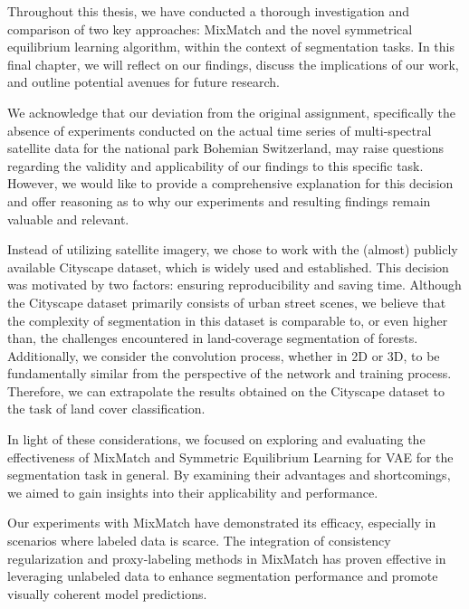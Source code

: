 Throughout this thesis, we have conducted a thorough investigation and comparison of two key approaches: MixMatch
and the novel symmetrical equilibrium learning algorithm, within the context of segmentation tasks. In this final chapter, we
will reflect on our findings, discuss the implications of our work, and outline potential avenues for future research.

We acknowledge that our deviation from the original assignment, specifically the absence of experiments conducted on the actual 
time series of multi-spectral satellite data for the national park Bohemian Switzerland, may raise questions regarding the validity 
and applicability of our findings to this specific task. However, we would like to provide a comprehensive explanation for this 
decision and offer reasoning as to why our experiments and resulting findings remain valuable and relevant.

Instead of utilizing satellite imagery, we chose to work with the (almost) publicly available Cityscape dataset, which is widely
used and established. This decision was motivated by two factors: ensuring reproducibility and saving time. Although the Cityscape 
dataset primarily consists of urban street scenes, we believe that the complexity of segmentation in this dataset is comparable to, or
even higher than, the challenges encountered in land-coverage segmentation of forests. Additionally, we consider the convolution 
process, whether in 2D or 3D, to be fundamentally similar from the perspective of the network and training process. Therefore, we 
can extrapolate the results obtained on the Cityscape dataset to the task of land cover classification.

In light of these considerations, we focused on exploring and evaluating the effectiveness of MixMatch and 
Symmetric Equilibrium Learning for VAE for the segmentation task in general. By examining their
advantages and shortcomings, we aimed to gain insights into their applicability and performance.

Our experiments with MixMatch have demonstrated its efficacy, especially in scenarios where labeled data is scarce. The integration of 
consistency regularization and proxy-labeling methods in MixMatch has proven effective in leveraging unlabeled data to enhance segmentation
performance and promote visually coherent model predictions.